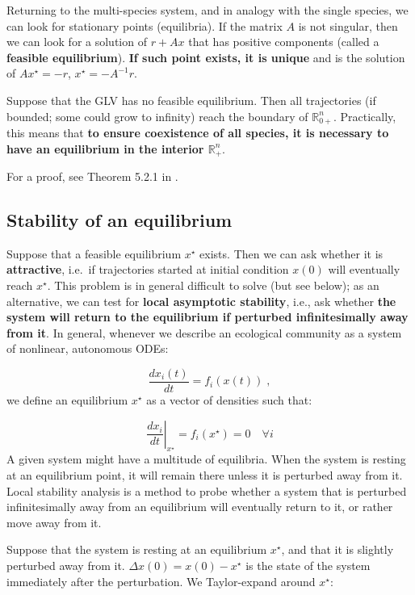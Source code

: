 \documentclass[
]{book}
\begin{document}
Returning to the multi-species system, and in analogy with the single species, we can look for stationary points (equilibria). If the matrix \(A\) is not singular, then we can look for a solution of \(r + Ax\) that has positive components (called a \textbf{feasible equilibrium}). \textbf{If such point exists, it is unique} and is the solution of \(Ax^\star = -r\), \(x^\star = -A^{-1}r\).

Suppose that the GLV has no feasible equilibrium. Then all trajectories (if bounded; some could grow to infinity) reach the boundary of \(\mathbb R^n_{0+}\). Practically, this means that \textbf{to ensure coexistence of all species, it is necessary to have an equilibrium in the interior \(\mathbb R^n_{+}\)}.

For a proof, see Theorem 5.2.1 in \citet{hofbauer1998evolutionary}.

\hypertarget{stability-of-an-equilibrium}{%
\subsection{Stability of an equilibrium}\label{stability-of-an-equilibrium}}

Suppose that a feasible equilibrium \(x^\star\) exists. Then we can ask whether it is \textbf{attractive}, i.e.~if trajectories started at initial condition \(x(0)\) will eventually reach \(x^\star\). This problem is in general difficult to solve (but see below); as an alternative, we can test for \textbf{local asymptotic stability}, i.e., ask whether \textbf{the system will return to the equilibrium if perturbed infinitesimally away from it}. In general, whenever we describe an ecological community as a system of nonlinear, autonomous ODEs:

\[
\frac{d x_i (t)}{d t} = f_i (x(t)) \;,
\]
we define an equilibrium \(x^\star\) as a vector of densities such that:

\[
\left. \frac{d x_i}{d t} \right|_{{x}^\star} = f_i
({x}^\star) = 0 \quad \forall i
\]
A given system might have a multitude of equilibria. When the system is resting at an equilibrium point, it will remain there unless it is perturbed away from it. Local stability analysis is a method to probe whether a system that is perturbed infinitesimally away from an equilibrium will eventually return to it, or rather move away from it.

Suppose that the system is resting at an equilibrium \(x^\star\), and that it is slightly perturbed away from it. \(\Delta x(0) = x(0)-x^\star\) is the state of the system immediately after the perturbation. We Taylor-expand around \(x^\star\):
\end{document}
